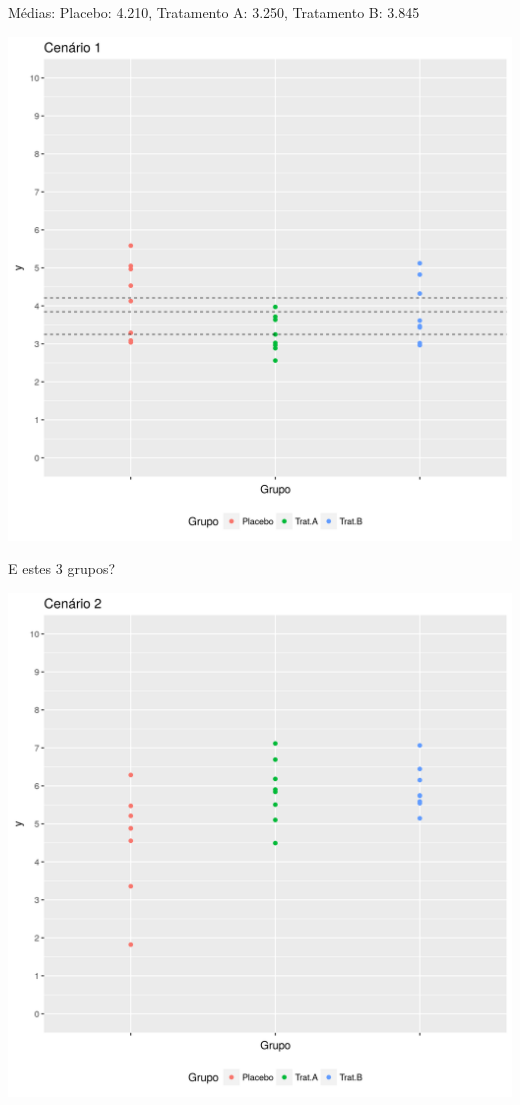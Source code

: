 \documentclass{beamer}
\begin{document}
\begin{frame}{Médias: Placebo: 4.210, Tratamento A: 3.250, Tratamento B: 3.845}
  \begin{center}
    \includegraphics[height=.9\textheight]{Topicos_adv/cenario1_medias}

  \end{center}
\end{frame}

\begin{frame}{E estes 3 grupos?}
  \begin{center}
    \includegraphics[height=.9\textheight]{Topicos_adv/cenario2}
  \end{center}
\end{frame}
\end{document}
